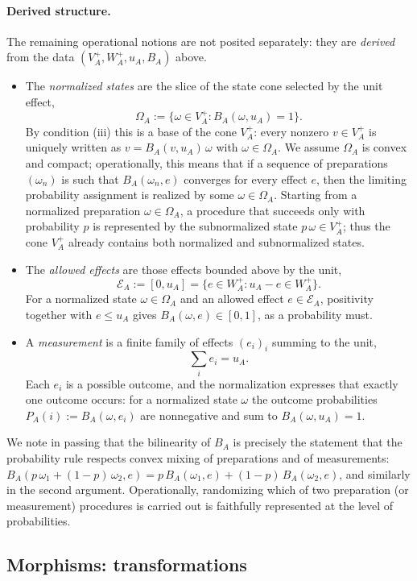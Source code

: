 \documentclass[prl,aps,10pt,superscriptaddress, floatfix]{revtex4-2}
\begin{document}
\paragraph{Derived structure.}
The remaining operational notions are not posited separately: they are \emph{derived} from the data $(V_A^+,W_A^+,u_A,B_A)$ above.
\begin{itemize}
\item The \emph{normalized states} are the slice of the state cone selected by the unit effect,
\[
\Omega_A:=\{\omega\in V_A^+: B_A(\omega,u_A)=1\}.
\]
By condition (iii) this is a base of the cone $V_A^+$: every nonzero $v\in V_A^+$ is uniquely written as $v=B_A(v,u_A)\,\omega$ with $\omega\in\Omega_A$. We assume $\Omega_A$ is convex and compact; operationally, this means that if a sequence of preparations $(\omega_n)$ is such that $B_A(\omega_n,e)$ converges for every effect $e$, then the limiting probability assignment is realized by some $\omega\in\Omega_A$. Starting from a normalized preparation $\omega\in\Omega_A$, a procedure that succeeds only with probability $p$ is represented by the subnormalized state $p\,\omega\in V_A^+$; thus the cone $V_A^+$ already contains both normalized and subnormalized states.
\item The \emph{allowed effects} are those effects bounded above by the unit,
\[
\mathcal E_A:=[0,u_A]=\{e\in W_A^+: u_A-e\in W_A^+\}.
\]
For a normalized state $\omega\in\Omega_A$ and an allowed effect $e\in\mathcal E_A$, positivity together with $e\le u_A$ gives $B_A(\omega,e)\in[0,1]$, as a probability must.
\item A \emph{measurement} is a finite family of effects $(e_i)_i$ summing to the unit,
\[
\sum_i e_i = u_A.
\]
Each $e_i$ is a possible outcome, and the normalization expresses that exactly one outcome occurs: for a normalized state $\omega$ the outcome probabilities $P_A(i):=B_A(\omega,e_i)$ are nonnegative and sum to $B_A(\omega,u_A)=1$.
\end{itemize}
We note in passing that the bilinearity of $B_A$ is precisely the statement that the probability rule respects convex mixing of preparations and of measurements: $B_A(p\,\omega_1+(1-p)\,\omega_2,e)=p\,B_A(\omega_1,e)+(1-p)\,B_A(\omega_2,e)$, and similarly in the second argument. Operationally, randomizing which of two preparation (or measurement) procedures is carried out is faithfully represented at the level of probabilities.

\subsection{Morphisms: transformations}
\end{document}
